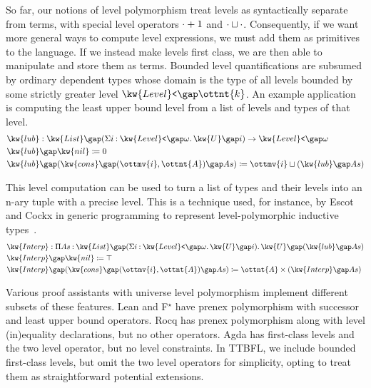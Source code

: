 \documentclass[a4paper,UKenglish,cleveref,autoref,thm-restate]{lipics-v2021}
\makeatletter
\newcommand{\citep}[1]{\cite{#1}}
\newcommand{\lang}{TTBFL\@\xspace}
\makeatother
\begin{document}
So far, our notions of level polymorphism treat levels as syntactically separate from terms,
with special level operators $\cdot   \relax   + 1 $ and $\cdot   \relax   \sqcup   \relax   \cdot$.
Consequently, if we want more general ways to compute level expressions,
we must add them as primitives to the language.
If we instead make levels first class,
we are then able to manipulate and store them as terms.
Bounded level quantifications are subsumed by ordinary dependent types
whose domain is the type of all levels bounded by some strictly greater level $ \kw{Level}\texttt{<} \gap  \ottnt{k} $.
An example application is computing the least upper bound level
from a list of levels and types of that level.
%
\begin{align*}
   \kw{ lub }  &:    \kw{ List }   \gap   (  \Sigma  i  \mathbin{:}   \kw{Level}\texttt{<} \gap   \omega    \mathpunct{.}   \kw{U} \gap  i   )    \to   \kw{Level}\texttt{<} \gap   \omega    \\
   \kw{ lub }  &\gap  \kw{ nil }  \coloneqq 0 \\
   \kw{ lub }  &\gap  (    \kw{ cons }   \gap   (   \ottmv{i}   ,  \ottnt{A}  )    \gap  As  )  \coloneqq   \ottmv{i}   \sqcup   (   \kw{ lub }   \gap  As  )  
\end{align*}

This level computation can be used to turn a list of types and their levels
into an n-ary tuple with a precise level.
This is a technique used, for instance, by Escot and Cockx in generic programming
to represent level-polymorphic inductive types~\citep{generic}.
%
\begin{align*}
   \kw{ Interp }  &:  \Pi  As  \mathbin{:}    \kw{ List }   \gap   (  \Sigma  i  \mathbin{:}   \kw{Level}\texttt{<} \gap   \omega    \mathpunct{.}   \kw{U} \gap  i   )    \mathpunct{.}   \kw{U} \gap   (   \kw{ lub }   \gap  As  )    \\
   \kw{ Interp }  &\gap  \kw{ nil }  \coloneqq  \top  \\
   \kw{ Interp }  &\gap  (    \kw{ cons }   \gap   (   \ottmv{i}   ,  \ottnt{A}  )    \gap  As  )  \coloneqq  \ottnt{A}  \times   (   \kw{ Interp }   \gap  As  )  
\end{align*}

Various proof assistants with universe level polymorphism implement different subsets of these features.
Lean and F$^\star$ have prenex polymorphism with successor and least upper bound operators.
Rocq has prenex polymorphism along with level (in)equality declarations,
but no other operators.
Agda has first-class levels and the two level operator, but no level constraints.
In \lang, we include bounded first-class levels,
but omit the two level operators for simplicity,
opting to treat them as straightforward potential extensions.
\end{document}
